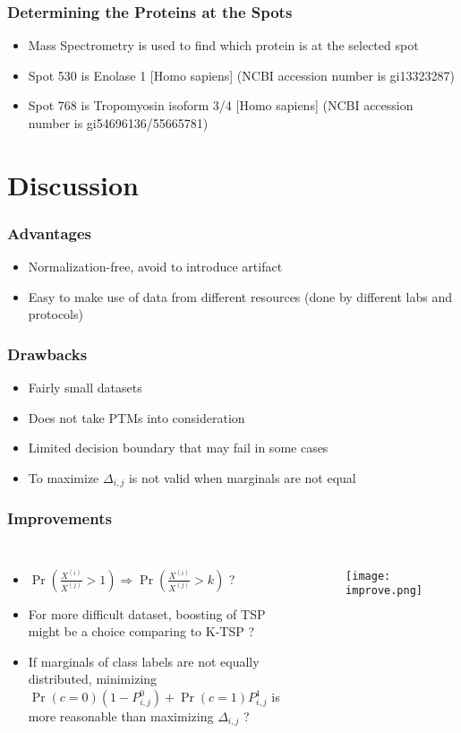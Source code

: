 \documentclass{beamer}
\begin{document}
\begin{frame}
\frametitle{Determining the Proteins at the Spots}
\begin{itemize}
\item Mass Spectrometry is used to find which protein is at the selected spot
\item Spot 530 is Enolase 1 [Homo sapiens] (NCBI accession number is gi13323287)
\item Spot 768 is Tropomyosin isoform 3/4 [Homo sapiens] (NCBI accession number is gi54696136/55665781)
\end{itemize}
\end{frame}

\section{Discussion}
\begin{frame}
\frametitle{Advantages}
\begin{itemize}
\item Normalization-free, avoid to introduce artifact
\item Easy to make use of data from different resources (done by different labs and protocols)
\end{itemize}
\end{frame}

\begin{frame}
\frametitle{Drawbacks}
\begin{itemize}
\item Fairly small datasets
\item Does not take PTMs into consideration
\item Limited decision boundary that may fail in some cases
\item To maximize $\Delta_{i, j}$ is not valid when marginals are not equal
\end{itemize}
\end{frame}

\begin{frame}
\frametitle{Improvements}
\begin{columns}[c] %
\begin{itemize}
\item $\Pr(\frac{X^{(i)}}{X^{(j)}} > 1) \Rightarrow \Pr(\frac{X^{(i)}}{X^{(j)}} > k)$ ? 
\item For more difficult dataset, boosting of TSP might be a choice comparing to K-TSP ?
\item If marginals of class labels are not equally distributed, minimizing $\Pr(c = 0)(1 - P^0_{i, j}) + \Pr(c = 1)P^1_{i, j}$ is more reasonable than maximizing $\Delta_{i, j}$ ?
\end{itemize}
\begin{figure}
  \texttt{[image: improve.png]}
\end{figure}
\end{columns}
\end{frame}
\end{document}
